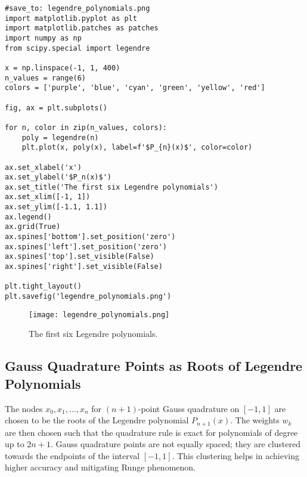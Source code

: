 \documentclass{article}
\begin{document}
\begin{verbatim}
#save_to: legendre_polynomials.png
import matplotlib.pyplot as plt
import matplotlib.patches as patches
import numpy as np
from scipy.special import legendre

x = np.linspace(-1, 1, 400)
n_values = range(6)
colors = ['purple', 'blue', 'cyan', 'green', 'yellow', 'red']

fig, ax = plt.subplots()

for n, color in zip(n_values, colors):
    poly = legendre(n)
    plt.plot(x, poly(x), label=f'$P_{n}(x)$', color=color)

ax.set_xlabel('x')
ax.set_ylabel('$P_n(x)$')
ax.set_title('The first six Legendre polynomials')
ax.set_xlim([-1, 1])
ax.set_ylim([-1.1, 1.1])
ax.legend()
ax.grid(True)
ax.spines['bottom'].set_position('zero')
ax.spines['left'].set_position('zero')
ax.spines['top'].set_visible(False)
ax.spines['right'].set_visible(False)

plt.tight_layout()
plt.savefig('legendre_polynomials.png')
\end{verbatim}

\begin{figure}[h]
    \centering
    \texttt{[image: legendre\_polynomials.png]}
    \caption{The first six Legendre polynomials.}
    \label{fig:legendre_polynomials}
\end{figure}


\subsection{Gauss Quadrature Points as Roots of Legendre Polynomials}
The nodes $x_0, x_1, \dots, x_n$ for $(n+1)$-point Gauss quadrature on $[-1, 1]$ are chosen to be the roots of the Legendre polynomial $P_{n+1}(x)$. The weights $w_k$ are then chosen such that the quadrature rule is exact for polynomials of degree up to $2n+1$.
Gauss quadrature points are not equally spaced; they are clustered towards the endpoints of the interval $[-1, 1]$. This clustering helps in achieving higher accuracy and mitigating Runge phenomenon.
\end{document}
